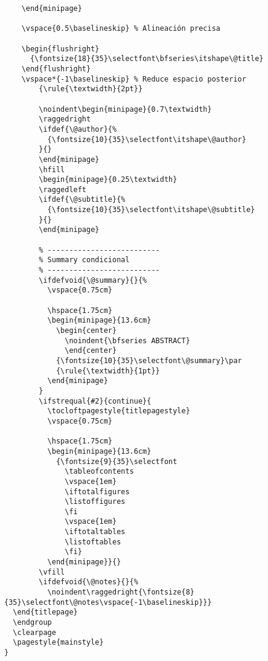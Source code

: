 \documentclass{reporti}
\begin{document}
\begin{verbatim}
    \end{minipage}
    
    \vspace{0.5\baselineskip} % Alineación precisa

    \begin{flushright}
      {\fontsize{18}{35}\selectfont\bfseries\itshape\@title}
    \end{flushright}
    \vspace*{-1\baselineskip} % Reduce espacio posterior
        {\rule{\textwidth}{2pt}}

        \noindent\begin{minipage}{0.7\textwidth}
        \raggedright
        \ifdef{\@author}{%
          {\fontsize{10}{35}\selectfont\itshape\@author}
        }{}
        \end{minipage}
        \hfill
        \begin{minipage}{0.25\textwidth}
        \raggedleft
        \ifdef{\@subtitle}{%
          {\fontsize{10}{35}\selectfont\itshape\@subtitle}
        }{}
        \end{minipage}

        % --------------------------
        % Summary condicional
        % --------------------------
        \ifdefvoid{\@summary}{}{%
          \vspace{0.75cm}

          \hspace{1.75cm}
          \begin{minipage}{13.6cm}
            \begin{center}
              \noindent{\bfseries ABSTRACT}
              \end{center}
            {\fontsize{10}{35}\selectfont\@summary}\par
            {\rule{\textwidth}{1pt}}
          \end{minipage}
        }
        \ifstrequal{#2}{continue}{
          \tocloftpagestyle{titlepagestyle}
          \vspace{0.75cm}

          \hspace{1.75cm}
          \begin{minipage}{13.6cm}
            {\fontsize{9}{35}\selectfont
              \tableofcontents
              \vspace{1em}
              \iftotalfigures
              \listoffigures
              \fi
              \vspace{1em}
              \iftotaltables
              \listoftables
              \fi}
          \end{minipage}}{}
        \vfill
        \ifdefvoid{\@notes}{}{%
          \noindent\raggedright{\fontsize{8}{35}\selectfont\@notes\vspace{-1\baselineskip}}}
  \end{titlepage}
  \endgroup
  \clearpage
  \pagestyle{mainstyle}
}


\end{verbatim}
\end{document}
